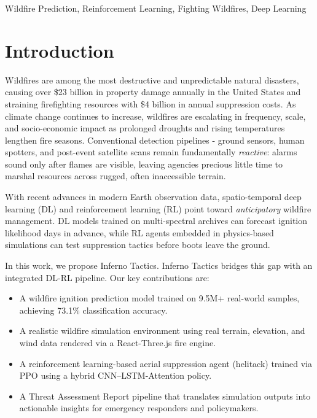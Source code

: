 \documentclass[conference]{IEEEtran}
\begin{document}
\begin{IEEEkeywords}
Wildfire Prediction, Reinforcement Learning, Fighting Wildfires, Deep Learning
\end{IEEEkeywords}

\section{Introduction}

Wildfires are among the most destructive and unpredictable natural disasters, causing over \$23 billion in property damage annually in the United States and straining firefighting resources with \$4 billion in annual suppression costs. As climate change continues to increase, wildfires are escalating in frequency, scale, and socio-economic impact as prolonged droughts and rising temperatures lengthen fire seasons. Conventional detection pipelines - ground sensors, human spotters, and post-event satellite scans remain fundamentally \emph{reactive}: alarms sound only after flames are visible, leaving agencies precious little time to marshal resources across rugged, often inaccessible terrain. 

With recent advances in modern Earth observation data, spatio-temporal deep learning (DL) and reinforcement learning (RL) point toward \emph{anticipatory} wildfire management. DL models trained on multi-spectral archives can forecast ignition likelihood days in advance, while RL agents embedded in physics-based simulations can test suppression tactics before boots leave the ground. 

In this work, we propose Inferno Tactics. Inferno Tactics bridges this gap with an integrated DL-RL pipeline. Our key contributions are:
\begin{itemize}
    \item A wildfire ignition prediction model trained on 9.5M+ real-world samples, achieving 73.1\% classification accuracy.
    \item A realistic wildfire simulation environment using real terrain, elevation, and wind data rendered via a React-Three.js fire engine.
    \item A reinforcement learning-based aerial suppression agent (helitack) trained via PPO using a hybrid CNN–LSTM-Attention policy.
    \item A Threat Assessment Report pipeline that translates simulation outputs into actionable insights for emergency responders and policymakers.
\end{itemize}
\end{document}
